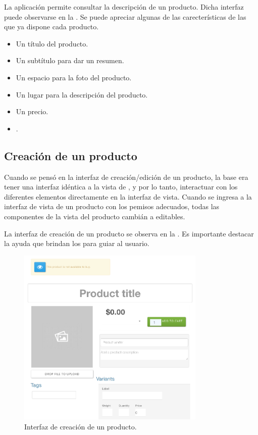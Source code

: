		La aplicación permite consultar la descripción de un producto. Dicha interfaz puede observarse en la . Se puede apreciar algunas de las carecterísticas de las que ya dispone cada producto.

		\begin{itemize}
			\item
				Un título del producto.
			\item
				Un subtítulo para dar un resumen.
			\item
				Un espacio para la foto del producto.
			\item
				Un lugar para la descripción del producto.
			\item
				Un precio.
			\item
				\tagsForm.
		\end{itemize}

	\subsection{Creación de un producto}

		Cuando se pensó en la interfaz de creación/edición de un producto, la base era tener una interfaz idéntica a la vista de , y por lo tanto, interactuar con los diferentes elementos directamente en la interfaz de vista.
		Cuando se ingresa a la interfaz de vista de un producto con los pemisos adecuados, todas las componentes de la vista del producto cambián a editables.

		La interfaz de creación de un producto se observa en la . Es importante destacar la ayuda que brindan los \placeholdersINT para guiar al usuario.

		\begin{figure}[H]
			\centering
			\includegraphics[width=0.8\textwidth]{figuras/productos/details/write/new.png}

			\caption{Interfaz de creación de un producto.}
			\label{figure:solution:product:create:form}
		\end{figure}

